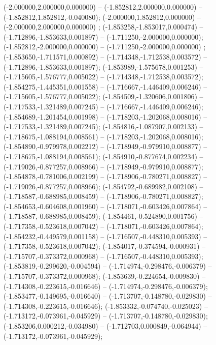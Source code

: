  (-2.000000,2.000000,0.000000) -- (-1.852812,2.000000,0.000000) -- (-1.852812,1.852812,-0.040080);
 (-2.000000,1.852812,0.000000) -- (-2.000000,2.000000,0.000000) ;
 (-1.853258,-1.853017,0.000474) -- (-1.712896,-1.853633,0.001897) -- (-1.711250,-2.000000,0.000000);
 (-1.852812,-2.000000,0.000000) -- (-1.711250,-2.000000,0.000000) ;
 (-1.853650,-1.711571,0.000892) -- (-1.714348,-1.712538,0.003572) -- (-1.712896,-1.853633,0.001897);
 (-1.853989,-1.575678,0.001253) -- (-1.715605,-1.576777,0.005022) -- (-1.714348,-1.712538,0.003572);
 (-1.854275,-1.445351,0.001558) -- (-1.716667,-1.446409,0.006246) -- (-1.715605,-1.576777,0.005022);
 (-1.854509,-1.320606,0.001806) -- (-1.717533,-1.321489,0.007245) -- (-1.716667,-1.446409,0.006246);
 (-1.854689,-1.201454,0.001998) -- (-1.718203,-1.202068,0.008016) -- (-1.717533,-1.321489,0.007245);
 (-1.854816,-1.087907,0.002133) -- (-1.718675,-1.088194,0.008561) -- (-1.718203,-1.202068,0.008016);
 (-1.854890,-0.979978,0.002212) -- (-1.718949,-0.979910,0.008877) -- (-1.718675,-1.088194,0.008561);
 (-1.854910,-0.877674,0.002234) -- (-1.719026,-0.877257,0.008966) -- (-1.718949,-0.979910,0.008877);
 (-1.854878,-0.781006,0.002199) -- (-1.718906,-0.780271,0.008827) -- (-1.719026,-0.877257,0.008966);
 (-1.854792,-0.689982,0.002108) -- (-1.718587,-0.688985,0.008459) -- (-1.718906,-0.780271,0.008827);
 (-1.854653,-0.604608,0.001960) -- (-1.718071,-0.603426,0.007864) -- (-1.718587,-0.688985,0.008459);
 (-1.854461,-0.524890,0.001756) -- (-1.717358,-0.523618,0.007042) -- (-1.718071,-0.603426,0.007864);
 (-1.854232,-0.449579,0.001158) -- (-1.716507,-0.448310,0.005393) -- (-1.717358,-0.523618,0.007042);
 (-1.854017,-0.374594,-0.000931) -- (-1.715707,-0.373372,0.000968) -- (-1.716507,-0.448310,0.005393);
 (-1.853819,-0.299620,-0.004594) -- (-1.714974,-0.298476,-0.006379) -- (-1.715707,-0.373372,0.000968);
 (-1.853639,-0.224654,-0.009830) -- (-1.714308,-0.223615,-0.016646) -- (-1.714974,-0.298476,-0.006379);
 (-1.853477,-0.149695,-0.016640) -- (-1.713707,-0.148780,-0.029830) -- (-1.714308,-0.223615,-0.016646);
 (-1.853332,-0.074740,-0.025023) -- (-1.713172,-0.073961,-0.045929) -- (-1.713707,-0.148780,-0.029830);
 (-1.853206,0.000212,-0.034980) -- (-1.712703,0.000849,-0.064944) -- (-1.713172,-0.073961,-0.045929);
